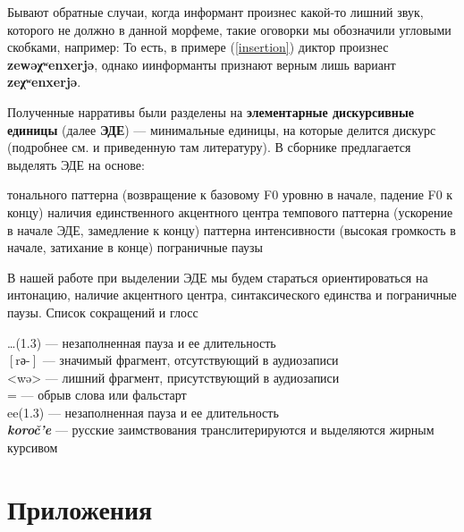 \par Бывают обратные случаи, когда информант произнес какой-то лишний звук, которого не должно в данной морфеме, такие оговорки мы обозначили угловыми скобками, например:
То есть, в примере (\ref{insertion}) диктор произнес \textbf{zewəχʷenxerjə}, однако иинформанты признают верным лишь вариант \textbf{zeχʷenxerjə}.
\par Полученные нарративы были разделены на \textbf{элементарные дискурсивные единицы} (далее \textbf{ЭДЕ}) --- минимальные единицы, на которые делится дискурс (подробнее см. \cite[55--102]{kibrik14} и приведенную там литературу). В сборнике \cite[60]{kibrik14} предлагается выделять ЭДЕ на основе:
\begin{itemize}
\mytem тонального паттерна (возвращение к базовому F0 уровню в начале, падение F0 к концу)
\mytem наличия единственного акцентного центра
\mytem темпового паттерна (ускорение в начале ЭДЕ, замедление к концу)
\mytem паттерна интенсивности (высокая громкость в начале, затихание в конце)
\mytem пограничные паузы
\end{itemize}
В нашей работе при выделении ЭДЕ мы будем стараться ориентироваться на интонацию, наличие акцентного центра, синтаксического единства и пограничные паузы.
\vfill 
\pagebreak
\footnotesize
\noindent Список сокращений и глосс
\begin{multicols}{2}
\noindent …(1.3) --- незаполненная пауза и ее длительность\\
$\left[\mbox{rə-}\right]$ --- значимый фрагмент, отсутствующий в аудиозаписи\\
<wə> --- лишний фрагмент, присутствующий в аудиозаписи\\
 = --- обрыв слова или фальстарт\\
ee(1.3) --- незаполненная пауза и ее длительность\\
\textbf{\textit{koroč'e}} --- русские заимствования транслитерируются и выделяются жирным курсивом\\
\end{multicols}


\normalsize
\section{Приложения}

